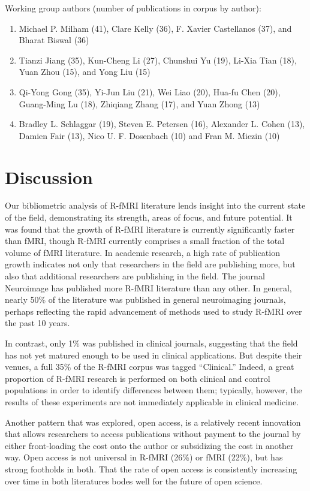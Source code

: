 \documentclass[12pt,3p,review,number]{elsarticle}
\begin{document}
Working group authors (number of publications in corpus by author):
\begin{enumerate}
\item Michael P. Milham (41), Clare Kelly (36), F. Xavier Castellanos (37), and
Bharat Biswal (36) 
\item Tianzi Jiang (35), Kun-Cheng Li (27), Chunshui Yu (19),
Li-Xia Tian (18), Yuan Zhou (15), and Yong Liu (15) 
\item Qi-Yong Gong (35), Yi-Jun Liu (21), Wei Liao (20), Hua-fu Chen (20),
Guang-Ming Lu (18), Zhiqiang Zhang (17), and Yuan Zhong (13) 
\item Bradley L. Schlaggar (19), Steven E. Petersen (16), Alexander L.
Cohen (13), Damien Fair (13), Nico U. F. Dosenbach (10) and Fran M. Miezin (10)
\end{enumerate}

\section{Discussion}

Our bibliometric analysis of R-fMRI literature lends insight into the current
state of the field, demonstrating its strength, areas of focus, and future
potential. It was found that the growth of R-fMRI literature is currently
significantly faster than fMRI, though R-fMRI currently comprises a small
fraction of the total volume of fMRI literature. In academic research, a high
rate of publication growth indicates not only that researchers in the field are
publishing more, but also that additional researchers are publishing in the
field. The journal Neuroimage has published more R-fMRI literature than any
other. In general, nearly 50\% of the literature was published in general
neuroimaging journals, perhaps reflecting the rapid advancement of methods used
to study R-fMRI over the past 10 years. 

In contrast, only 1\% was published in clinical journals, suggesting that the
field has not yet matured enough to be used in clinical applications. But
despite their venues, a full 35\% of the R-fMRI corpus was tagged “Clinical.”
Indeed, a great proportion of R-fMRI research is performed on both clinical and
control populations in order to identify differences between them; typically,
however, the results of these experiments are not immediately applicable in
clinical medicine.

Another pattern that was explored, open access, is a relatively recent
innovation that allows researchers to access publications without payment to the
journal by either front-loading the cost onto the author or subsidizing the cost
in another way. Open access is not universal in R-fMRI (26\%) or fMRI (22\%), but
has strong footholds in both. That the rate of open access is consistently
increasing over time in both literatures bodes well for the future of open
science.
\end{document}
